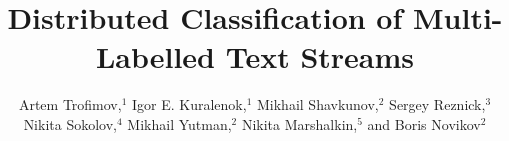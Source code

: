 \documentclass[sigconf]{acmart}
\theoremstyle{remark}
\begin{document}

\title {Distributed Classification of Multi-Labelled Text Streams}

\author{Artem Trofimov,$^ {1}$    Igor E. Kuralenok,$^1$    Mikhail Shavkunov,$^2$    Sergey Reznick,$^3$     Nikita Sokolov,$^{4}$   Mikhail Yutman,$^2$    Nikita Marshalkin,$^ {5}$   and  Boris Novikov$^ {2}$ }
\end{document}
